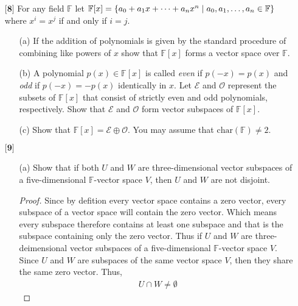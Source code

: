 \documentclass[12pt]{article}
\newcommand      {\Fm}         {{\mathbb F}}
\begin{document}
\begin{itemize}
\begin{itemize}
    \end{itemize}
    
    \vspace{.5cm}
    
    \item[$\textbf{[8]}$]%
    For any field $\mathbb{F}$ let $\mathbb{F}[x] = \{ a_0 + a_1x + \dots + a_nx^n \hspace{.1cm} | \hspace{.1cm} a_0,a_1,\dots,a_n \in \mathbb{F} \}$ where $x^i = x^j$ if and only if $i = j$. 
    \begin{itemize}
    
    \vspace{.3cm}
    \item[(a)]
    If the addition of polynomials is given by the standard procedure of combining like powers of $x$ show that $\mathbb{F}[x]$ forms a vector space over $\mathbb{F}$.
    
    \vspace{.3cm}
    \item[(b)]
    A polynomial $p(x) \in \mathbb{F}[x]$ is called \textit{even} if $p(-x) = p(x)$ and \textit{odd} if $p(-x) = -p(x)$ identically in $x$. Let $\mathcal{E}$ and $\mathcal{O}$ represent the subsets of $\mathbb{F}[x]$ that consist of strictly even and odd polynomials, respectively. Show that $\mathcal{E}$ and $\mathcal{O}$ form vector subspaces of $\mathbb{F}[x]$. 
    
    \vspace{.3cm}
    \item[(c)]
    Show that $\mathbb{F}[x] = \mathcal{E} \oplus \mathcal{O}$. You may assume that $\text{char}(\mathbb{F}) \neq 2$. 
    
    \end{itemize} 
    
    \vspace{.5cm}
    
    \item[$\textbf{[9]}$]%
    \begin{itemize}
    
    \item[(a)]
    Show that if both $U$ and $W$ are three-dimensional vector subspaces of a five-dimensional $\mathbb{F}$-vector space $V$, then $U$ and $W$ are not disjoint. 

    \begin{proof}
        Since by defition every vector space contains a zero vector, every subspace of a vector space will contain the zero vector. Which means every subspace therefore contains at least one subspace and that is the subspace containing only the zero vector. Thus if $U$ and $W$ are three-deimensional vector subspaces of a five-dimensional $\Fm$-vector space $V$. Since $U$ and $W$ are subspaces of the same vector space $V$, then they share the same zero vector. Thus,
        \begin{align*}
            U \cap W \neq \emptyset
        \end{align*}
    \end{proof}
    

\end{itemize}
\end{itemize}
\end{document}
